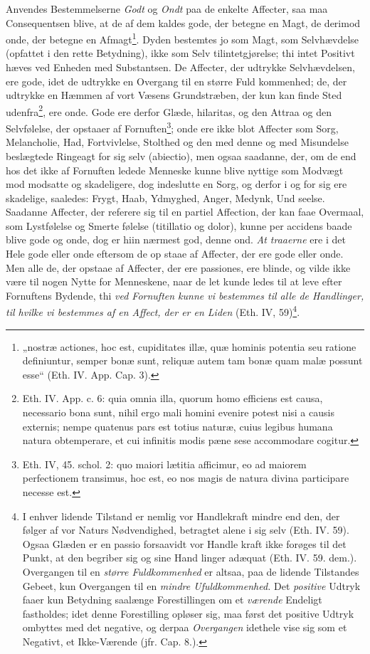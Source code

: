 \documentclass[12pt,a4paper]{book}
\newcommand{\opage}[1]{\marginnote{\footnotesize\textit{[#1]}}}
\begin{document}
Anvendes Bestemmelserne \emph{Godt} og \emph{Ondt} paa de
enkelte Affecter, saa maa Consequentsen blive, at de af dem
kaldes gode, der betegne en Magt, de derimod onde, der
betegne en Afmagt\footnote{„nostræ actiones, hoc est, cupiditates illæ, quæ hominis potentia
seu ratione definiuntur, semper bonæ sunt, reliquæ autem tam bonæ
quam malæ possunt esse“ (Eth. IV. App. Cap. 3).}. Dyden bestemtes jo som Magt, som
Selvhævdelse (opfattet i den rette Betydning), ikke som Selv\-%
tilintetgjørelse; thi intet Positivt hæves ved Enheden med
Substantsen. De Affecter, der udtrykke Selvhævdelsen, ere
gode, idet de udtrykke en Overgang til en større Fuld\-%
kommenhed; de, der udtrykke en Hæmmen af vort Væsens
\opage{129} \setcounter{footnote}{0}%
Grundstræben, der kun kan finde Sted udenfra\footnote{Eth. IV. App. c. 6: quia omnia illa, quorum homo efficiens est
causa, necessario bona sunt, nihil ergo mali homini evenire potest
nisi a causis externis; nempe quatenus pars est totius naturæ,
cuius legibus humana natura obtemperare, et cui infinitis modis
pæne sese accommodare cogitur.}, ere onde.
Gode ere derfor Glæde, hilaritas, og den Attraa og den
Selvfølelse, der opstaaer af Fornuften\footnote{Eth. IV, 45. schol. 2: quo maiori lætitia afficimur, eo ad maiorem
perfectionem transimus, hoc est, eo nos magis de natura divina
participare necesse est.}; onde ere ikke blot
Affecter som Sorg, Melancholie, Had, Fortvivlelse, Stolthed
og den med denne og med Misundelse beslægtede Ringeagt
for sig selv (abiectio), men ogsaa saadanne, der, om de end
hos det ikke af Fornuften ledede Menneske kunne blive
nyttige som Modvægt mod modsatte og skadeligere, dog
indeslutte en Sorg, og derfor i og for sig ere skadelige,
saaledes: Frygt, Haab, Ydmyghed, Anger, Medynk, Und\-%
seelse. Saadanne Affecter, der referere sig til en partiel
Affection, der kan faae Overmaal, som Lystfølelse og Smerte\-%
følelse (titillatio og dolor), kunne per accidens baade blive
gode og onde, dog er hiin nærmest god, denne ond. \emph{At\-%
traaerne} ere i det Hele gode eller onde eftersom de op\-%
staae af Affecter, der ere gode eller onde. Men alle de,
der opstaae af Affecter, der ere passiones, ere blinde, og
vilde ikke være til nogen Nytte for Menneskene, naar de
let kunde ledes til at leve efter Fornuftens Bydende, thi
\emph{ved Fornuften kunne vi bestemmes til alle de
Handlinger, til hvilke vi bestemmes af en Affect,
der er en Liden} (Eth. IV, 59)\footnote{I enhver lidende Tilstand er nemlig vor Handlekraft mindre end den,
der følger af vor Naturs Nødvendighed, betragtet alene i sig selv
(Eth. IV. 59). Ogsaa Glæden er en passio forsaavidt vor Handle\-%
kraft ikke forøges til det Punkt, at den begriber sig og sine Hand\-%
linger adæquat (Eth. IV. 59. dem.). Overgangen til en \emph{større
Fuldkommenhed} er altsaa, paa de lidende Tilstandes Gebeet, kun
Overgangen til en \emph{mindre Ufuldkommenhed.} Det \emph{positive}
Udtryk faaer kun Betydning saalænge Forestillingen om et \emph{værende}
Endeligt fastholdes; idet denne Forestilling opløser sig, maa først
det positive Udtryk ombyttes med det negative, og derpaa \emph{Overgangen} idethele vise sig som et Negativt, et Ikke-Værende (jfr.
Cap. 8.).}.
\end{document}
